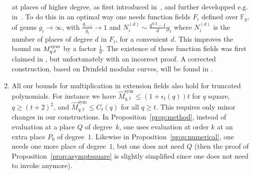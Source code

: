 \documentclass[11pt]{article}
\begin{document}
\begin{enumerate}
at places of higher degree, as first introduced in~\cite{BR04}, and further developped e.g. in~\cite{CCXY12,Randriam12}.
To do this in an optimal way one needs function fields $F_i$ defined over $\mathbb{F}_q$,
of genus $g_i\to\infty$, with $\frac{g_{i+1}}{g_i}\to 1$ and $N_i^{(d)}\sim\frac{q^{d/2}-1}{d}g_i$
where $N_i^{(d)}$ is the number of places of degree $d$ in $F_i$, for a convenient $d$.
This improves the bound on $M^{\textrm{sym}}_{q,t}$ by a factor $\frac{1}{d}$.
The existence of these function fields was first claimed in \cite{CCXY12}, but unfortunately with an incorrect proof.
A corrected construction, based on Drinfeld modular curves, will be found in \cite{BBRR20+}.
\item All our bounds for multiplication in extension fields also hold for truncated polynomials.
For instance we have $\hat{M}^{\textrm{sym}}_{q,t}\leq(1+\epsilon_t(q))t$ for $q$ square, $q\geq(t+2)^2$,
and $\hat{M}^{\textrm{sym}}_{q,t}\leq C_t(q)$ for all $q\geq t$.
This requires only minor changes in our constructions.
In Proposition~\ref{prop:method}, instead of evaluation at a place $Q$ of degree~$k$, one uses evaluation at order $k$
at an extra place $P_0$ of degree~$1$.
Likewise in Proposition~\ref{prop:numerical}, one needs one more place of degree~$1$, but one does not need $Q$
(then the proof of Proposition~\ref{prop:asymptsquare} is slightly simplified since one does not need to invoke \cite[Cor.~5.2.10]{Stichtenoth09} anymore).
\end{enumerate}

\small


\end{document}
